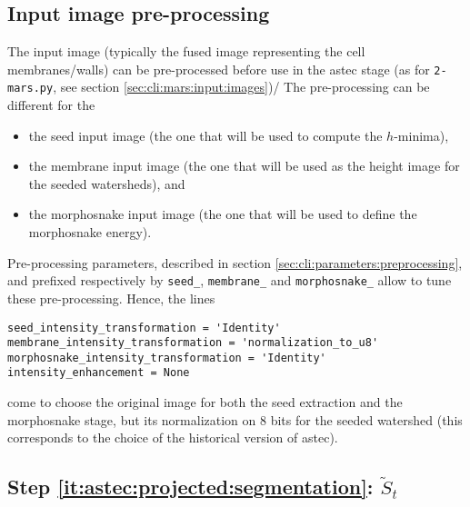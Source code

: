 


\subsection{Input image pre-processing}
\label{sec:cli:astec:input:images}


The input image (typically the fused image representing the cell membranes/walls) can be pre-processed before use in the astec stage (as for \texttt{2-mars.py}, see section \ref{sec:cli:mars:input:images})/
The pre-processing can be different for the 
\begin{itemize}
\itemsep -0.5ex
\item the seed input image (the one that will be used to compute the $h$-minima),
\item the membrane input image (the one that will be used as the height image for the seeded watersheds), and
\item the morphosnake input image (the one that will be used to define the morphosnake energy).
\end{itemize}

Pre-processing parameters, described in section \ref{sec:cli:parameters:preprocessing}, and prefixed respectively by \texttt{seed\_}, \texttt{membrane\_} and \texttt{morphosnake\_} allow to tune these pre-processing.
Hence, the lines
\begin{verbatim}
seed_intensity_transformation = 'Identity'
membrane_intensity_transformation = 'normalization_to_u8'
morphosnake_intensity_transformation = 'Identity'
intensity_enhancement = None
\end{verbatim}
come to choose the original image for both the seed extraction and the morphosnake stage, but its normalization on 8 bits for the seeded watershed (this corresponds to the choice of the historical version of astec).


\subsection{Step \ref{it:astec:projected:segmentation}: $\tilde{S}_{t}$}

